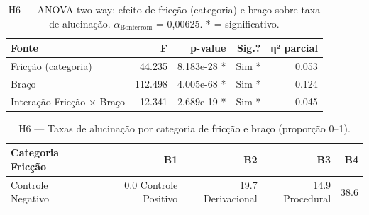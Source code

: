 \begin{table}[htbp]
\centering
\caption{H6 — ANOVA two-way: efeito de fricção (categoria) e braço sobre taxa de alucinação. $\alpha_\text{Bonferroni}$ = 0{,}00625. * = significativo.}
\label{tab:t8_h6_anova}
\small
\begin{tabular}{lrrrr}
\toprule
Fonte & F & p-value & Sig.? & η² parcial \\
\midrule
Fricção (categoria) & 44.235 & 8.183e-28 * & Sim * & 0.053 \\
Braço & 112.498 & 4.005e-68 * & Sim * & 0.124 \\
Interação Fricção × Braço & 12.341 & 2.689e-19 * & Sim * & 0.045 \\
\bottomrule
\end{tabular}
\end{table}

\begin{table}[htbp]
\centering
\caption{H6 — Taxas de alucinação por categoria de fricção e braço (proporção 0--1).}
\label{tab:t8_h6_rates}
\small
\begin{tabular}{lrrrr}
\toprule
Categoria Fricção & B1 & B2 & B3 & B4 \\
\midrule
Controle Negativo & 0.0%
Controle Positivo & 19.7%
Derivacional & 14.9%
Procedural & 38.6%
\bottomrule
\end{tabular}
\end{table}
